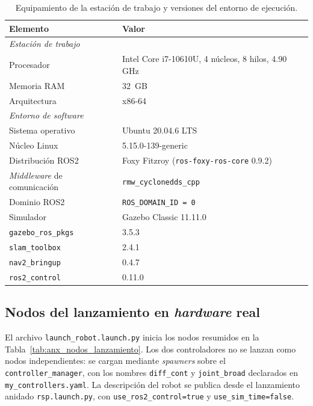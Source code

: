 \begin{appendices}
\begin{table}[H]
\centering
\caption{Equipamiento de la estación de trabajo y versiones del entorno de ejecución.}
\label{tab:anx_versiones_sw}
\small
\begin{tabular}{ll}
\toprule
\textbf{Elemento} & \textbf{Valor} \\
\midrule
\multicolumn{2}{l}{\textit{Estación de trabajo}}\\
Procesador & Intel Core i7-10610U, 4 núcleos, 8 hilos, 4.90 GHz \\
Memoria RAM & 32~GB \\
Arquitectura & x86-64 \\
\midrule
\multicolumn{2}{l}{\textit{Entorno de software}}\\
Sistema operativo & Ubuntu 20.04.6 LTS \\
Núcleo Linux & 5.15.0-139-generic \\
Distribución \gls{ROS2} & Foxy Fitzroy (\texttt{ros-foxy-ros-core} 0.9.2) \\
\textit{Middleware} de comunicación & \texttt{rmw\_cyclonedds\_cpp} \\
Dominio \gls{ROS2} & \texttt{ROS\_DOMAIN\_ID = 0} \\
Simulador & Gazebo Classic 11.11.0 \\
\texttt{gazebo\_ros\_pkgs} & 3.5.3 \\
\texttt{slam\_toolbox} & 2.4.1 \\
\texttt{nav2\_bringup} & 0.4.7 \\
\texttt{ros2\_control} & 0.11.0 \\
\bottomrule
\end{tabular}
\end{table}

\subsection{Nodos del lanzamiento en \texorpdfstring{\textit{hardware}}{hardware} real}
\label{anx:nodos_lanzamiento}

El archivo \texttt{launch\_robot.launch.py} inicia los nodos resumidos en la
Tabla~\ref{tab:anx_nodos_lanzamiento}. Los dos controladores no se lanzan
como nodos independientes: se cargan mediante \textit{spawners} sobre el
\texttt{controller\_manager}, con los nombres \texttt{diff\_cont} y
\texttt{joint\_broad} declarados en \texttt{my\_controllers.yaml}. La
descripción del robot se publica desde el lanzamiento anidado
\texttt{rsp.launch.py}, con \texttt{use\_ros2\_control=true} y
\texttt{use\_sim\_time=false}.


\end{appendices}
